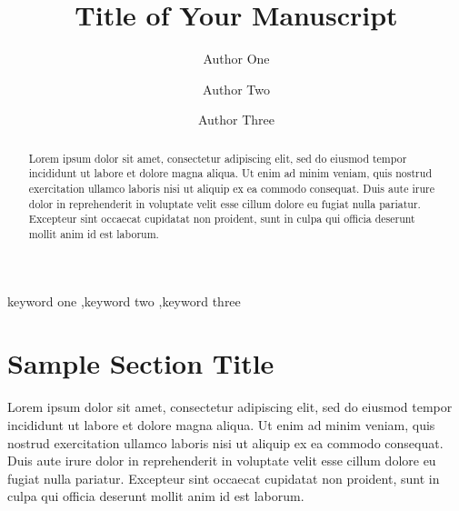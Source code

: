 \documentclass[12pt]{elsarticle}
\begin{document}
\begin{frontmatter}

\title{Title of Your Manuscript}
\date{ }

\author[1,2,3]{Author One}
\author[2,*]{Author Two}
\author[1]{Author Three}

\address[1]{Department of Computing, Research Group, Av. Brasil, 200, São Paulo, SP, Brazil}
\address[2]{School of Science, University of Technology, 2000 J St. NW, Washington DC, 20036, USA}
\address[3]{Center Of Intelligence, Faculty of Sciences, 50 West 4th Street, New York NY, 37895, USA}
\address[*]{Corresponding author: email2@myemail.com}


\begin{abstract}
Lorem ipsum dolor sit amet, consectetur adipiscing elit, sed do eiusmod tempor incididunt ut labore et dolore magna aliqua. Ut enim ad minim veniam, quis nostrud exercitation ullamco laboris nisi ut aliquip ex ea commodo consequat. Duis aute irure dolor in reprehenderit in voluptate velit esse cillum dolore eu fugiat nulla pariatur. Excepteur sint occaecat cupidatat non proident, sunt in culpa qui officia deserunt mollit anim id est laborum.
\end{abstract}

\begin{keyword}
keyword one \sep keyword two \sep keyword three
\end{keyword}

\end{frontmatter}

\section{Sample Section Title}
\label{sec:sample1}


Lorem ipsum dolor sit amet, consectetur adipiscing \citep{Fabioetal2013} elit, sed do eiusmod tempor incididunt ut labore et dolore magna \citet{Blondeletal2008} aliqua. Ut enim ad minim veniam, quis nostrud exercitation ullamco laboris nisi ut aliquip ex ea commodo consequat. Duis aute irure dolor in reprehenderit in voluptate velit esse cillum dolore eu fugiat nulla pariatur. Excepteur sint occaecat cupidatat non proident, sunt in culpa qui officia deserunt mollit \citet{Blondeletal2008,FabricioLiang2013} anim id est laborum.
\end{document}

